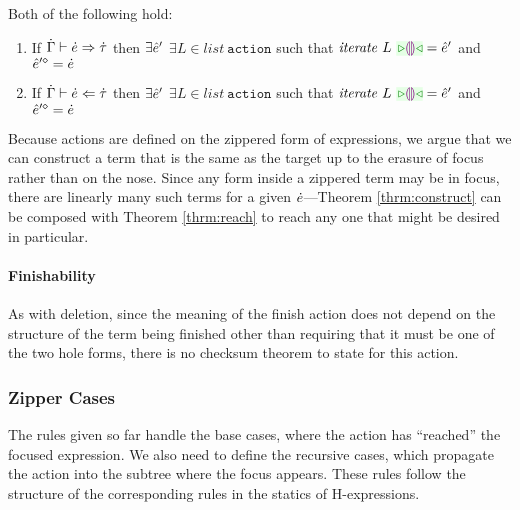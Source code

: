 \begin{theorem}[Constructability]
\label{thrm:construct}
Both of the following hold:
\begin{enumerate}
  \item If $\dot{\Gamma} \vdash \dot{e} \Rightarrow \dot{\tau}$ then $\exists \hat{e}'$ $\exists
      L \in \mathit{list} ~\mathtt{action}$ such that
      $\mathit{iterate}~ L~ \zwsel{\hhole{}} = \zexp'$ and
      $\hat{e}'^{\diamond} = \dot{e}$

  \item If $\dot{\Gamma} \vdash \dot{e} \Leftarrow \dot{\tau}$ then $\exists \hat{e}'$ $\exists
      L \in \mathit{list} ~\mathtt{action}$ such that $\mathit{iterate}~
      L~ \zwsel{\hhole{}} = \zexp'$ and $\hat{e}'^{\diamond} = \dot{e}$
\end{enumerate}
\end{theorem}

Because actions are defined on the zippered form of expressions, we argue
that we can construct a term that is the same as the target up to the
erasure of focus rather than on the nose. Since any form inside a zippered
term may be in focus, there are linearly many such terms for a given
$\dot{e}$---Theorem \ref{thrm:construct} can be composed with
Theorem \ref{thrm:reach} to reach any one that might be desired in
particular.

\paragraph{Finishability}
As with deletion, since the meaning of the finish action does not depend on
the structure of the term being finished other than requiring that it must
be one of the two hole forms, there is no checksum theorem to state for
this action.

\subsubsection{Zipper Cases}\label{sec:zipper-cases} The rules given so far handle the base cases, where the action has ``reached'' the focused expression. We also need to define the recursive cases, which propagate the action into the subtree where the focus appears. These rules follow the structure of the corresponding rules in the statics of H-expressions.

